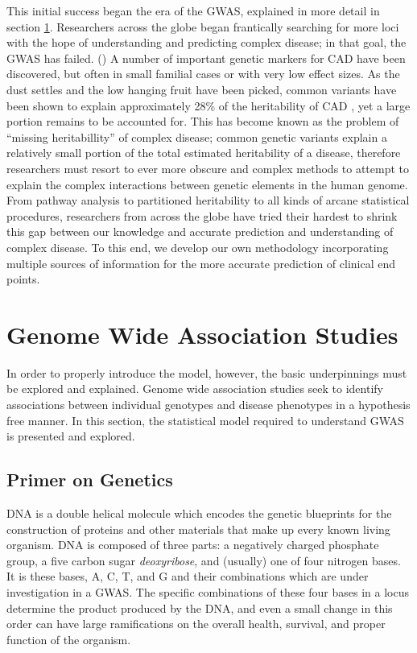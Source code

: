 This initial success began the era of the \ac{GWAS}, explained in more detail in section \ref{gwas}.  Researchers across the globe began frantically searching for more loci with the hope of understanding and predicting complex disease; in that goal, the \ac{GWAS} has failed. (\cite{Visscher2012}) A number of important genetic markers for \ac{CAD} have been discovered, but often in small familial cases or with very low effect sizes. As the dust settles and the low hanging fruit have been picked, common variants have been shown to explain approximately 28\% of the heritability of \ac{CAD} \citep{TheCARDIoGRAMplusC4DConsortium2015}, yet a large portion remains to be accounted for. This has become known as the problem of ``missing heritabillity'' of complex disease; common genetic variants explain a relatively small portion of the total estimated heritability of a disease, therefore researchers must resort to ever more obscure and complex methods to attempt to explain the complex interactions between genetic elements in the human genome. From pathway analysis to partitioned heritability to all kinds of arcane statistical procedures, researchers from across the globe have tried their hardest to shrink this gap between our knowledge and accurate prediction and understanding of complex disease. To this end, we develop our own methodology incorporating multiple sources of information for the more accurate prediction of clinical end points. 

\section{Genome Wide Association Studies} \label{gwas}

In order to properly introduce the model, however, the basic underpinnings must be explored and explained. Genome wide association studies seek to identify associations between individual genotypes and disease phenotypes in a hypothesis free manner. In this section, the statistical model required to understand \ac{GWAS} is presented and explored.

\subsection{Primer on Genetics}

\ac{DNA} is a double helical molecule which encodes the genetic blueprints for the construction of proteins and other materials that make up every known living organism. \ac{DNA} is composed of three parts: a negatively charged phosphate group, a five carbon sugar \textit{deoxyribose}, and (usually) one of four nitrogen bases. It is these bases, \ac{A}, \ac{C}, \ac{T}, and \ac{G} and their combinations which are under investigation in a \ac{GWAS}. The specific combinations of these four bases in a \ac{locus} determine the product produced by the \ac{DNA}, and even a small change in this order can have large ramifications on the overall health, survival, and proper function of the organism. 

